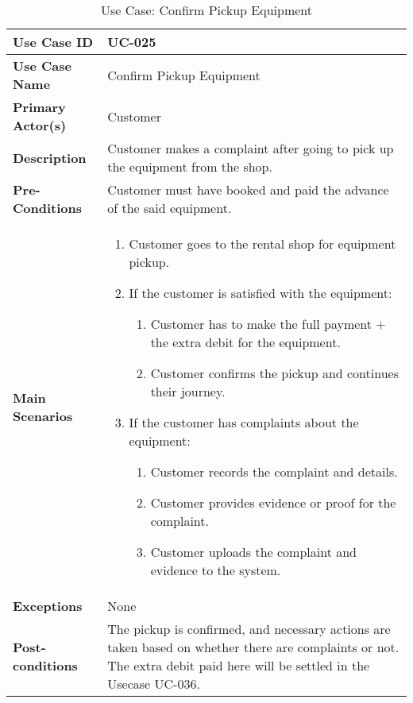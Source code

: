 \begin{table}[ht]
    \centering
    \begin{tabular}{|l|p{}|}
        \hline
        \textbf{Use Case ID} & UC-025 \\
        \hline
        \textbf{Use Case Name} & Confirm Pickup Equipment \\
        \hline
        \textbf{Primary Actor(s)} & Customer \\
        \hline
        \textbf{Description} & Customer makes a complaint after going to pick up the equipment from the shop. \\
        \hline
        \textbf{Pre-Conditions} & Customer must have booked and paid the advance of the said equipment. \\
        \hline
        \textbf{Main Scenarios} & 
        \begin{enumerate}[label=\arabic*.,itemsep=0pt]
            \item Customer goes to the rental shop for equipment pickup.
            \item If the customer is satisfied with the equipment:
                \begin{enumerate}[label=\alph*.,itemsep=0pt]
                    \item  Customer has to make the full payment + the extra debit for the equipment.
                    \item Customer confirms the pickup and continues their journey.
                \end{enumerate}
            \item If the customer has complaints about the equipment:
                \begin{enumerate}[label=\alph*.,itemsep=0pt]
                    \item Customer records the complaint and details.
                    \item Customer provides evidence or proof for the complaint.
                    \item Customer uploads the complaint and evidence to the system.
                \end{enumerate}
        \end{enumerate} \\
        \hline
        \textbf{Exceptions} & None \\
        \hline
        \textbf{Post-conditions} & The pickup is confirmed, and necessary actions are taken based on whether there are complaints or not.
        \break The extra debit paid here will be settled in the Usecase UC-036. \\
        \hline
    \end{tabular}
    \label{tab:use-case-confirm-pickup-equipment}
    \caption{Use Case: Confirm Pickup Equipment}
\end{table}




